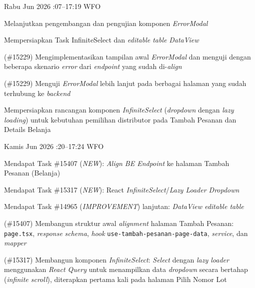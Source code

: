 \begin{logtable}
    {
        Rabu  Jun 2026 :07--17:19 \linebreak %
        WFO
    }{
        \begin{loglist}
            \item Melanjutkan pengembangan dan pengujian komponen \textit{ErrorModal}
            \item Mempersiapkan Task InfiniteSelect dan \textit{editable table} \textit{DataView}
        \end{loglist}
    }{
        \begin{logwork}
            \item (\#15229) Mengimplementasikan tampilan awal \textit{ErrorModal} dan menguji dengan beberapa skenario \textit{error} dari \textit{endpoint} yang sudah di-\textit{align}
            \item (\#15229) Menguji \textit{ErrorModal} lebih lanjut pada berbagai halaman yang sudah terhubung ke \textit{backend}
            \item Mempersiapkan rancangan komponen \textit{InfiniteSelect} (\textit{dropdown}
            dengan \textit{lazy loading}) untuk kebutuhan pemilihan distributor pada Tambah
            Pesanan dan Details Belanja
        \end{logwork}
    }

    {
        Kamis  Jun 2026 :20--17:24 \linebreak %
        WFO
    }{
        \begin{loglist}
            \item Mendapat Task \#15407 (\textit{NEW}): \textit{Align BE Endpoint} ke halaman
            Tambah Pesanan (Belanja)
            \item Mendapat Task \#15317 (\textit{NEW}): React
            \textit{InfiniteSelect}/\textit{Lazy Loader Dropdown}
            \item Mendapat Task \#14965 (\textit{IMPROVEMENT}) lanjutan: \textit{DataView
                editable table}
        \end{loglist}
    }{
        \begin{logwork}
            \item (\#15407) Membangun struktur awal \textit{alignment} halaman Tambah Pesanan: \texttt{page.tsx}, \textit{response} \textit{schema}, \textit{hook} \texttt{use-tambah-pesanan-page-data}, \textit{service}, dan \textit{mapper}
            \item (\#15317) Membangun komponen \textit{InfiniteSelect}: \textit{Select} dengan \textit{lazy loader} menggunakan \textit{React Query} untuk menampilkan data \textit{dropdown} secara bertahap (\textit{infinite scroll}), diterapkan pertama kali pada halaman Pilih Nomor Lot
        \end{logwork}
    }


\end{logtable}
